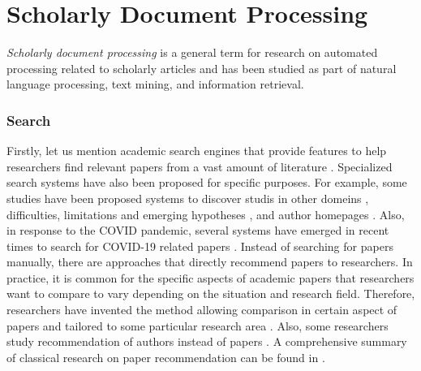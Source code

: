 \documentclass{article}
\begin{document}

\section{Scholarly Document Processing}
\label{appendix:scholarly-document-processing}
\textit{Scholarly document processing} is a general term for research on automated processing related to scholarly articles and has been studied as part of natural language processing, text mining, and information retrieval.
\subsubsection{Search}
Firstly, let us mention academic search engines that provide features to help researchers find relevant papers from a vast amount of literature \cite{googlescholar,semanticscholar,dblp,pubmed,citeseerx}. 
Specialized search systems have also been proposed for specific purposes. For example, some studies have been proposed systems to discover studis in other domeins \cite{kang2022augmenting}, difficulties, limitations and emerging hypotheses \cite{lahav2022search}, and author homepages \cite{patel2021author}. Also, in response to the COVID pandemic, several systems have emerged in recent times to search for COVID-19 related papers \cite{hope2020scisight}.
Instead of searching for papers manually, there are approaches that directly recommend papers to researchers. In practice, it is common for the specific aspects of academic papers that researchers want to compare to vary depending on the situation and research field. Therefore, researchers have invented the method allowing comparison in certain aspect of papers \cite{ostendorff2020aspect} and tailored to some particular research area \cite{breitinger2022recommending}. Also, some researchers study recommendation of authors instead of papers \cite{portenoy2022bursting}. A comprehensive summary of classical research on paper recommendation can be found in \cite{bai2019scientific}.
\end{document}
